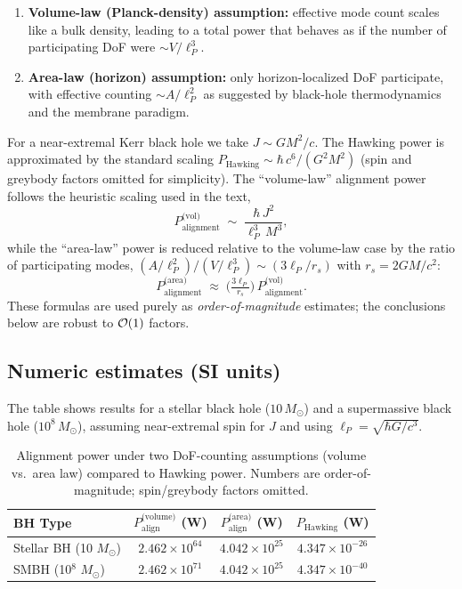 \documentclass[11pt]{article}
\begin{document}
\begin{enumerate}
  \item \textbf{Volume-law (Planck-density) assumption:} effective mode count scales like a bulk density,
  leading to a total power that behaves as if the number of participating DoF
  were $\sim V/\ell_P^3$.

  \item \textbf{Area-law (horizon) assumption:} only horizon-localized DoF participate, with effective
  counting $\sim A/\ell_P^2$ as suggested by black-hole thermodynamics and the membrane paradigm.
\end{enumerate}

For a near-extremal Kerr black hole we take $J \sim G M^2/c$.
The Hawking power is approximated by the standard scaling
$P_{\text{Hawking}} \sim \hbar\, c^6 / (G^2 M^2)$ (spin and greybody factors omitted for simplicity).
The “volume-law” alignment power follows the heuristic scaling used in the text,
\[
P_{\text{alignment}}^{\text{(vol)}} \;\sim\; \frac{\hbar\,J^2}{\ell_P^3\,M^3},
\]
while the “area-law” power is reduced relative to the volume-law case by the ratio of participating
modes, $(A/\ell_P^2)/(V/\ell_P^3) \sim (3\ell_P/r_s)$ with $r_s=2GM/c^2$:
\[
P_{\text{alignment}}^{\text{(area)}} \;\approx\; \Big(\tfrac{3\ell_P}{r_s}\Big)\,
P_{\text{alignment}}^{\text{(vol)}}.
\]
These formulas are used purely as \emph{order-of-magnitude} estimates; the conclusions below are robust to ${\cal O}(1)$ factors.

\subsection*{Numeric estimates (SI units)}
The table shows results for a stellar black hole ($10\,M_\odot$) and a supermassive black hole
($10^8\,M_\odot$), assuming near-extremal spin for $J$ and using
$\ell_P=\sqrt{\hbar G/c^3}$.

\begin{table}[h]
\centering
\begin{tabular}{|l|c|c|c|}
\hline
BH Type & $P_{\text{align}}^{\text{(volume)}}$ (W) & $P_{\text{align}}^{\text{(area)}}$ (W) & $P_{\text{Hawking}}$ (W) \\
\hline
Stellar BH (10 $M_\odot$) & $2.462\times10^{64}$ & $4.042\times10^{25}$ & $4.347\times10^{-26}$ \\
SMBH (10$^8$ $M_\odot$)   & $2.462\times10^{71}$ & $4.042\times10^{25}$ & $4.347\times10^{-40}$ \\
\hline
\end{tabular}
\caption{Alignment power under two DoF-counting assumptions (volume vs.\ area law) compared to Hawking power.
Numbers are order-of-magnitude; spin/greybody factors omitted.}
\end{table}
\end{document}
